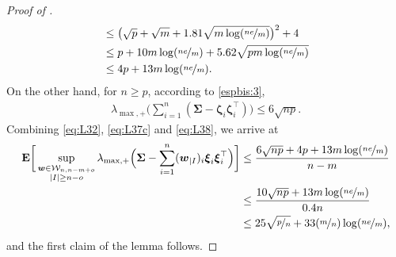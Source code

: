 \documentclass[aos,preprint,reqno]{imsart}
\newcommand\bxi{\boldsymbol\xi}
\newcommand\bzeta{\boldsymbol\zeta}
\newcommand\bSigma{\boldsymbol\Sigma}
\newcommand\bfE{\mathbf E}
\newcommand\bw{\boldsymbol w}
\theoremstyle{plain}
\theoremstyle{remark}
\begin{document}
\begin{proof}[Proof of ]
\begin{align}
			&\le \big(\sqrt{p} + \sqrt{m} +  1.81\sqrt{m \log(\nicefrac{ne}{m})}
				\big)^2+4\\
			&\le p+ 10m\log(\nicefrac{ne}{m}) + 5.62\sqrt{pm\log(\nicefrac{ne}{m})}\\
			&\le 4p + 13m\log(\nicefrac{ne}{m}).
		\label{eq:L37c}
	\end{align}
	On the other hand, for $n\ge p$, according to \eqref{espbis:3}, 
	\begin{align}
		\lambda_{\max,+}\bigg(\sum_{i=1}^n(\bSigma-\bzeta_i\bzeta_i^\top)\bigg)
			\le 6\sqrt{np}.\label{eq:L38}
	\end{align}
	Combining \eqref{eq:L32}, \eqref{eq:L37c} and  \eqref{eq:L38}, we arrive at 
	\begin{align}
		\bfE\bigg[\sup_{\substack{\bw\in \mathcal W_{n,n-m+o} \\ |I| \ge n-o}} 
		\lambda_{\max,+}\Big(\bSigma - \sum_{i=1}^n
			(\bw_{|I})_i\bxi_i\bxi_i^\top\Big)\bigg]
		&\le \frac{6\sqrt{np} + 4p+  13m \log(\nicefrac{ne}{m})}{n-m}\\
		&\le \frac{10\sqrt{np} +  13m \log(\nicefrac{ne}{m})}{0.4n}\\
		&\le 25\sqrt{\nicefrac{p}{n}}+33(\nicefrac{m}{n})\log(\nicefrac{ne}{m}),
	\end{align}	
	and the first claim of the lemma follows.



\end{proof}
\end{document}
